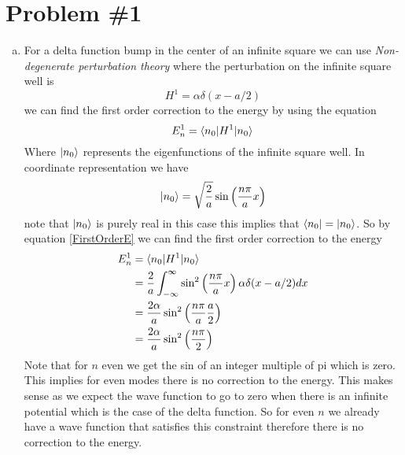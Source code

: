 \documentclass[11pt]{article}
\numberwithin{equation}{section}
\begin{document}


\section{Problem \#1}
\begin{enumerate}[(a)]
\item
For a delta function bump in the center of an infinite square we can use \emph{Non-degenerate perturbation theory} where the perturbation on the infinite square well is 
$$H^1 = \alpha\delta(x-a/2)$$
we can find the first order correction to the energy by using the equation
\begin{equation}
E_n^1 = \langle{n_0}|H^1|{n_0}\rangle
\label{FirstOrderE}
\end{equation}
Where $|{n_0}\rangle$ represents the eigenfunctions of the infinite square well. In coordinate representation we have
$$|{n_0}\rangle = \sqrt{\frac{2}{a}}\sin\left(\frac{n\pi}{a}x\right)$$
note that $|{n_0}\rangle$ is purely real in this case this implies that $\langle{n_0}|=|{n_0}\rangle$. So by equation \ref{FirstOrderE} we can find the first order correction to the energy
\begin{align*}
E_n^1 &= \langle{n_0}|H^1|{n_0}\rangle\\
&=\frac{2}{a}\int_{-\infty}^{\infty}\sin^2\left(\frac{n\pi}{a}x\right)\alpha\delta(x-a/2)dx\\
&=\frac{2\alpha}{a}\sin^2\left(\frac{n\pi}{a}\frac{a}{2}\right)\\
&=\frac{2\alpha}{a}\sin^2\left(\frac{n\pi}{2}\right)
\end{align*}
Note that for $n$ even we get the sin of an integer multiple of pi which is zero. This implies for even modes there is no correction to the energy. This makes sense as we expect the wave function to go to zero when there is an infinite potential which is the case of the delta function. So for even $n$ we already have a wave function that satisfies this constraint therefore there is no correction to the energy.


\end{enumerate}
\end{document}
